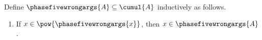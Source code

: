 \begin{inductive}\label{phase5_nested_wrong_arguments}
    Define $\phasefivewrongargs{A}\subseteq\cumul{A}$ inductively as follows.
    \begin{enumerate}
        \item If $x\in\pow{\phasefivewrongargs{x}}$, then
            $x\in\phasefivewrongargs{A}$.
    \end{enumerate}
\end{inductive}
